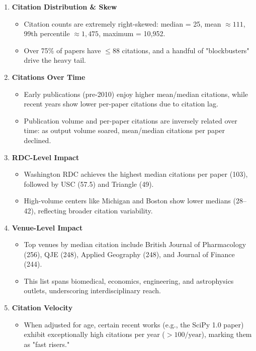\documentclass[12pt]{article}
\begin{document}
\begin{enumerate}
  \item \textbf{Citation Distribution \& Skew}
    \begin{itemize}
      \item Citation counts are extremely right-skewed: median = 25, mean \(\approx 111\), 99th percentile \(\approx 1{,}475\), maximum = 10{,}952.
      \item Over 75\% of papers have \(\le88\) citations, and a handful of "blockbusters" drive the heavy tail.
    \end{itemize}

  \item \textbf{Citations Over Time}
    \begin{itemize}
      \item Early publications (pre-2010) enjoy higher mean/median citations, while recent years show lower per-paper citations due to citation lag.
      \item Publication volume and per-paper citations are inversely related over time: as output volume soared, mean/median citations per paper declined.
    \end{itemize}

  \item \textbf{RDC-Level Impact}
    \begin{itemize}
      \item Washington RDC achieves the highest median citations per paper (103), followed by USC (57.5) and Triangle (49).
      \item High-volume centers like Michigan and Boston show lower medians (28–42), reflecting broader citation variability.
    \end{itemize}

  \item \textbf{Venue-Level Impact}
    \begin{itemize}
      \item Top venues by median citation include British Journal of Pharmacology (256), QJE (248), Applied Geography (248), and Journal of Finance (244).
      \item This list spans biomedical, economics, engineering, and astrophysics outlets, underscoring interdisciplinary reach.
    \end{itemize}

  \item \textbf{Citation Velocity}
    \begin{itemize}
      \item When adjusted for age, certain recent works (e.g., the SciPy 1.0 paper) exhibit exceptionally high citations per year (\(>100/\text{year}\)), marking them as "fast risers."
    \end{itemize}


\end{enumerate}
\end{document}
